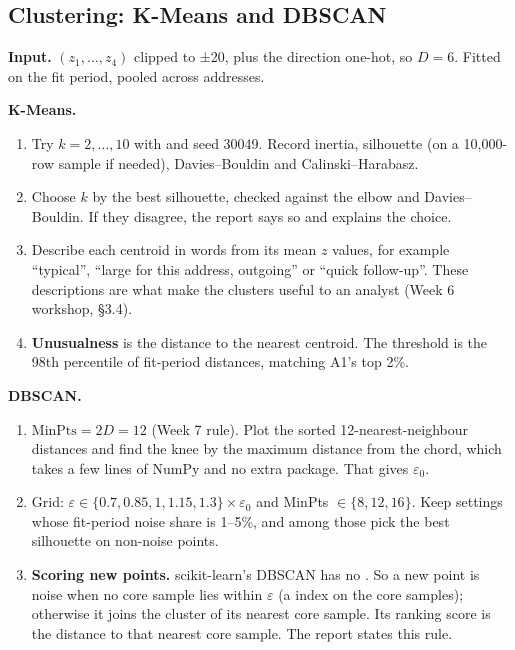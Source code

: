\subsection{Clustering: K-Means and DBSCAN}
\label{sec:clustering}

\textbf{Input.} $(z_1,\dots,z_4)$ clipped to ±20, plus the direction one-hot, so $D = 6$. Fitted on
the fit period, pooled across addresses.

\textbf{K-Means.}
\begin{enumerate}
  \item Try $k = 2,\dots,10$ with  and seed 30049. Record inertia, silhouette
    (on a 10,000-row sample if needed), Davies--Bouldin and Calinski--Harabasz.
  \item Choose $k$ by the best silhouette, checked against the elbow and Davies--Bouldin. If they
    disagree, the report says so and explains the choice.
  \item Describe each centroid in words from its mean $z$ values, for example ``typical'',
    ``large for this address, outgoing'' or ``quick follow-up''. These descriptions are what make
    the clusters useful to an analyst (Week 6 workshop, §3.4).
  \item \textbf{Unusualness} is the distance to the nearest centroid. The threshold is the 98th
    percentile of fit-period distances, matching A1's top 2\%.
\end{enumerate}

\textbf{DBSCAN.}
\begin{enumerate}
  \item $\text{MinPts} = 2D = 12$ (Week 7 rule). Plot the sorted 12-nearest-neighbour distances
    and find the knee by the maximum distance from the chord, which takes a few lines of NumPy
    and no extra package. That gives $\varepsilon_0$.
  \item Grid: $\varepsilon \in \{0.7, 0.85, 1, 1.15, 1.3\}\times\varepsilon_0$ and MinPts $\in
    \{8, 12, 16\}$. Keep settings whose fit-period noise share is 1--5\%, and among those pick the
    best silhouette on non-noise points.
  \item \textbf{Scoring new points.} scikit-learn's DBSCAN has no . So a new point is
    noise when no core sample lies within $\varepsilon$ (a  index on the
    core samples); otherwise it joins the cluster of its nearest core sample. Its ranking score is
    the distance to that nearest core sample. The report states this rule.
\end{enumerate}

